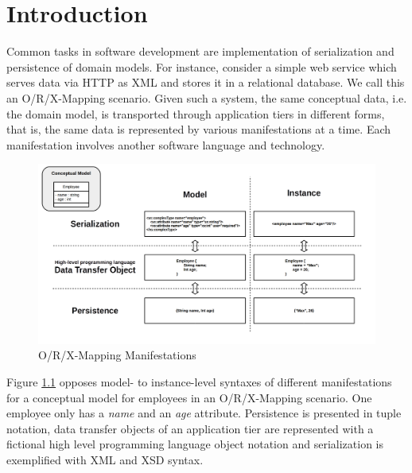 \chapter{Introduction}
\label{chapter:Introduction}
Common tasks in software development are implementation of serialization and persistence of domain models.
For instance, consider a simple web service which serves data via \gls{HTTP} as \gls{XML} and stores it in a relational database.
We call this an \gls{O/R/X-Mapping} scenario.
Given such a system, the same conceptual data, i.e. the domain model, is transported through application tiers in different forms, that is, the same data is represented by various manifestations at a time.
Each manifestation involves another software language and technology.
\begin{figure}[h!]
\begin{center}
\includegraphics[width=.9\textwidth]{images/ORX.png}
\end{center}
\caption{O/R/X-Mapping Manifestations}
\label{figure:ORXManifestations}
\end{figure}
Figure \ref{figure:ORXManifestations} opposes model- to instance-level syntaxes of different manifestations for a conceptual model for employees in an \gls{O/R/X-Mapping} scenario.
One employee only has a \textit{name} and an \textit{age} attribute.
Persistence is presented in tuple notation, data transfer objects of an application tier are represented with a fictional high level programming language object notation and serialization is exemplified with \gls{XML} and \gls{XSD} syntax.

